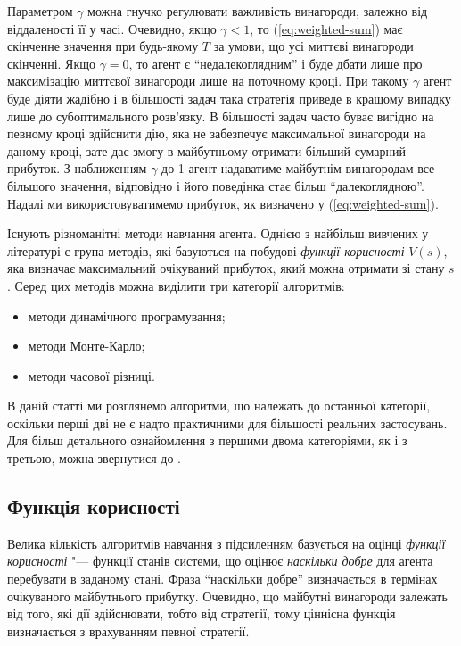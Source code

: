 \documentclass[a4paper,10pt,fleqn]{article}
\begin{document}
Параметром $\gamma$ можна гнучко регулювати важливість винагороди, залежно від віддаленості її у часі. Очевидно, якщо $\gamma<1$, то (\ref{eq:weighted-sum}) має скінченне значення при будь-якому $T$ за умови, що усі миттєві винагороди скінченні. Якщо $\gamma = 0$, то агент є ``недалекоглядним'' і буде дбати лише про максимізацію миттєвої винагороди лише на поточному кроці. При такому $\gamma$ агент буде діяти жадібно і в більшості задач така стратегія приведе в кращому випадку лише до субоптимального розв'язку. В більшості задач часто буває вигідно на певному кроці здійснити дію, яка не забезпечує максимальної винагороди на даному кроці, зате дає змогу в майбутньому отримати більший сумарний прибуток. З наближенням $\gamma$ до 1 агент надаватиме майбутнім винагородам все більшого значення, відповідно і його поведінка стає більш ``далекоглядною''. Надалі ми використовуватимемо прибуток, як визначено у (\ref{eq:weighted-sum}).

Існують різноманітні методи навчання агента. Однією з найбільш вивчених у літературі є група методів, які базуються на побудові \emph{функції корисності} $V(s)$, яка визначає максимальний очікуваний прибуток, який можна отримати зі стану $s$. Серед цих методів можна виділити три категорії алгоритмів:

\begin{itemize}
\item методи динамічного програмування;
\item методи Монте-Карло;
\item методи часової різниці.
\end{itemize}

В даній статті ми розглянемо алгоритми, що належать до останньої категорії, оскільки перші дві не є надто практичними для більшості реальних застосувань. Для більш детального ознайомлення з першими двома категоріями, як і з третьою, можна звернутися до \cite{SuttonBarto2002}.

\subsection{Функція корисності}

Велика кількість алгоритмів навчання з підсиленням базується на оцінці \emph{функції корисності} "--- функції станів системи, що оцінює \emph{наскільки добре} для агента перебувати в заданому стані. Фраза ``наскільки добре'' визначається в термінах очікуваного майбутнього прибутку. Очевидно, що майбутні винагороди залежать від того, які дії здійснювати, тобто від стратегії, тому ціннісна функція визначається з врахуванням певної стратегії.
\end{document}
